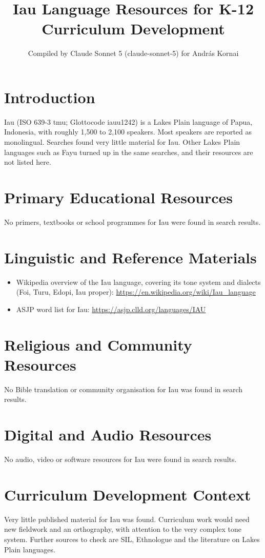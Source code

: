 \documentclass[12pt]{article}
\title{Iau Language Resources for K-12 Curriculum Development}
\author{Compiled by Claude Sonnet 5 (claude-sonnet-5) for Andr\'as Kornai}
\date{}
\begin{document}
\maketitle

\section{Introduction}
Iau (ISO 639-3 tmu; Glottocode iauu1242) is a Lakes Plain language of Papua, Indonesia, with roughly 1{,}500 to 2{,}100 speakers. Most speakers are reported as monolingual. Searches found very little material for Iau. Other Lakes Plain languages such as Fayu turned up in the same searches, and their resources are not listed here.

\section{Primary Educational Resources}
No primers, textbooks or school programmes for Iau were found in search results.

\section{Linguistic and Reference Materials}
\begin{itemize}
\item Wikipedia overview of the Iau language, covering its tone system and dialects (Foi, Turu, Edopi, Iau proper): \url{https://en.wikipedia.org/wiki/Iau_language}
\item ASJP word list for Iau: \url{https://asjp.clld.org/languages/IAU}
\end{itemize}

\section{Religious and Community Resources}
No Bible translation or community organisation for Iau was found in search results.

\section{Digital and Audio Resources}
No audio, video or software resources for Iau were found in search results.

\section{Curriculum Development Context}
Very little published material for Iau was found. Curriculum work would need new fieldwork and an orthography, with attention to the very complex tone system. Further sources to check are SIL, Ethnologue and the literature on Lakes Plain languages.
\end{document}

